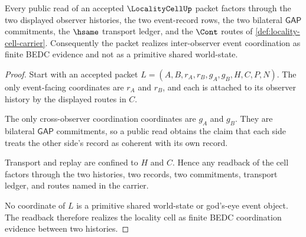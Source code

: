 \begin{theorem}
\label{thm:locality-cell-interobserver-readback}
Every public read of an accepted $\LocalityCellUp$ packet factors through the two displayed observer histories, the two event-record rows, the two bilateral $\mathsf{GAP}$ commitments, the $\hsame$ transport ledger, and the $\Cont$ routes of \autoref{def:locality-cell-carrier}. Consequently the packet realizes inter-observer event coordination as finite BEDC evidence and not as a primitive shared world-state.
\end{theorem}
\begin{proof}
Start with an accepted packet $L=(A,B,r_A,r_B,g_A,g_B,H,C,P,N)$. The only event-facing coordinates are $r_A$ and $r_B$, and each is attached to its observer history by the displayed routes in $C$.

The only cross-observer coordination coordinates are $g_A$ and $g_B$. They are bilateral $\mathsf{GAP}$ commitments, so a public read obtains the claim that each side treats the other side's record as coherent with its own record.

Transport and replay are confined to $H$ and $C$. Hence any readback of the cell factors through the two histories, two records, two commitments, transport ledger, and routes named in the carrier.

No coordinate of $L$ is a primitive shared world-state or god's-eye event object. The readback therefore realizes the locality cell as finite BEDC coordination evidence between two histories.
\end{proof}


